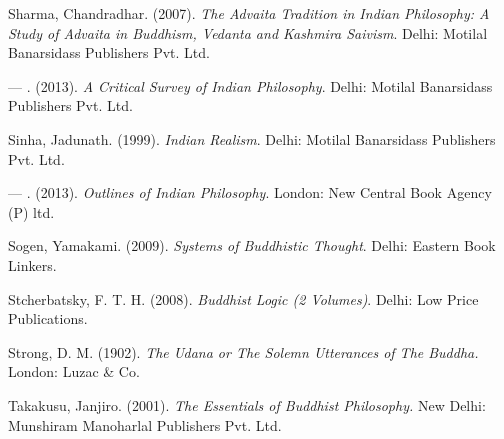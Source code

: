 \begin{thebibliography}{99}
  Sharma, Chandradhar. (2007). \textit{The Advaita Tradition in Indian Philosophy: A Study of Advaita in Buddhism, Vedanta and Kashmira Saivism}. Delhi: Motilal Banarsidass Publishers Pvt. Ltd.

  — . (2013). \textit{A Critical Survey of Indian Philosophy}. Delhi: Motilal Banarsidass Publishers Pvt. Ltd.

  Sinha, Jadunath. (1999). \textit{Indian Realism}. Delhi: Motilal Banarsidass Publishers Pvt. Ltd.

  — . (2013). \textit{Outlines of Indian Philosophy}. London: New Central Book Agency (P) ltd.

  Sogen, Yamakami. (2009). \textit{Systems of Buddhistic Thought}. Delhi: Eastern Book Linkers.

  Stcherbatsky, F. T. H. (2008). \textit{Buddhist Logic (2 Volumes)}. Delhi: Low Price Publications.

  Strong, D. M. (1902). \textit{The Udana or The Solemn Utterances of The Buddha.} London: Luzac \& Co.

  Takakusu, Janjiro. (2001). \textit{The Essentials of Buddhist Philosophy.} New Delhi: Munshiram Manoharlal Publishers Pvt. Ltd.
 
 \end{thebibliography}

\theendnotes

